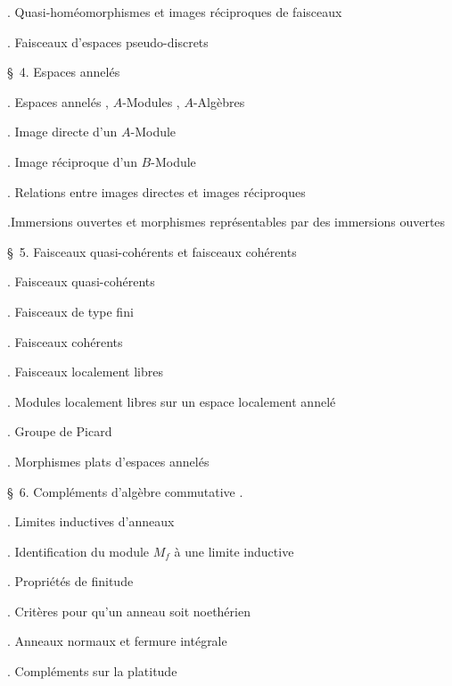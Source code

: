 

\noindent{}. Quasi-homéomorphismes et images réciproques de faisceaux\dotfill

\noindent{}. Faisceaux d'espaces pseudo-discrets\dotfill

\noindent\quad \S\ 4. Espaces annelés\dotfill

\noindent{}. Espaces annelés , $A$-Modules , $A$-Algèbres\dotfill

\noindent{}. Image directe d'un $A$-Module\dotfill

\noindent{}. Image réciproque d'un $B$-Module\dotfill

\noindent{}. Relations entre images directes et images réciproques\dotfill

\noindent{}.Immersions ouvertes et morphismes représentables par des immersions ouvertes \dotfill

\noindent\quad \S\ 5. Faisceaux quasi-cohérents et faisceaux cohérents\dotfill

\noindent{}. Faisceaux quasi-cohérents\dotfill

\noindent{}. Faisceaux de type fini\dotfill

\noindent{}. Faisceaux cohérents\dotfill

\noindent{}. Faisceaux localement libres\dotfill

\noindent{}. Modules localement libres sur un espace localement annelé\dotfill

\noindent{}. Groupe de Picard\dotfill

\noindent{}. Morphismes plats d'espaces annelés\dotfill

\noindent\quad \S\ 6. Compléments d'algèbre commutative .

\noindent{}. Limites inductives d'anneaux\dotfill

\noindent{}. Identification du module $M_f$ à une limite  inductive\dotfill

\noindent{}. Propriétés de finitude\dotfill

\noindent{}. Critères pour qu'un anneau soit noethérien\dotfill

\noindent{}. Anneaux normaux et fermure intégrale\dotfill

\noindent{}. Compléments sur la platitude\dotfill

